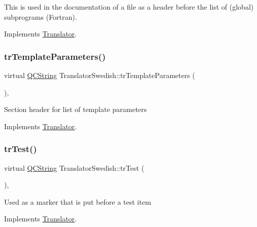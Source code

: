This is used in the documentation of a file as a header before the list of (global) subprograms (Fortran). 

Implements \mbox{\hyperlink{class_translator}{Translator}}.

\mbox{\label{class_translator_swedish_a237c8bf00989c69edc20e50184e70d01}} 
\subsubsection{\texorpdfstring{trTemplateParameters()}{trTemplateParameters()}}
{\footnotesize\ttfamily virtual \mbox{\hyperlink{class_q_c_string}{Q\+C\+String}} Translator\+Swedish\+::tr\+Template\+Parameters (\begin{DoxyParamCaption}{ }\end{DoxyParamCaption})\hspace{0.3cm}{\ttfamily [inline]}, {\ttfamily [virtual]}}

Section header for list of template parameters 

Implements \mbox{\hyperlink{class_translator}{Translator}}.

\mbox{\label{class_translator_swedish_a6346f10b14f11f7c42702e130b9d0021}} 
\subsubsection{\texorpdfstring{trTest()}{trTest()}}
{\footnotesize\ttfamily virtual \mbox{\hyperlink{class_q_c_string}{Q\+C\+String}} Translator\+Swedish\+::tr\+Test (\begin{DoxyParamCaption}{ }\end{DoxyParamCaption})\hspace{0.3cm}{\ttfamily [inline]}, {\ttfamily [virtual]}}

Used as a marker that is put before a test item 

Implements \mbox{\hyperlink{class_translator}{Translator}}.

\mbox{\label{class_translator_swedish_ae1e594b342985941b22308f7e4aac884}} 
